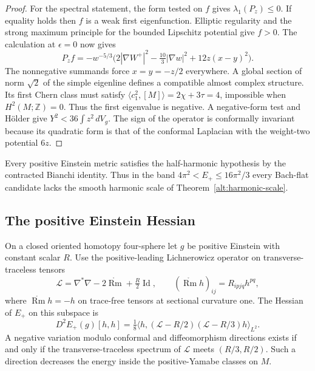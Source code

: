\begin{proof}
For the spectral statement, the form tested on \(f\) gives
\(\lambda_1(P_z)\le0\). If equality holds then \(f\) is a
weak first eigenfunction. Elliptic regularity and the strong
maximum principle for the bounded Lipschitz potential give
\(f>0\). The calculation at \(\epsilon=0\) now gives
\[
 P_z f=-w^{-5/3}
     \bigl(2|\nabla W^+|^2-\tfrac{10}{3}|\nabla w|^2
                    +12z(x-y)^2\bigr).
\]
The nonnegative summands force \(x=y=-z/2\) everywhere.
A global section of norm \(\sqrt2\) of the simple eigenline
defines a compatible almost complex structure. Its first
Chern class must satisfy
\(\langle c_1^2,[M]\rangle=2\chi+3\tau=4\), impossible
when \(H^2(M;\mathbb Z)=0\). Thus the first eigenvalue is
negative. A negative-form test and Hölder give
\(Y^2<36\int z^2\,dV_g\). The sign of the operator is conformally
invariant because its quadratic form is that of the conformal
Laplacian with the weight-two potential \(6z\).
\end{proof}

Every positive Einstein metric satisfies the half-harmonic
hypothesis by the contracted Bianchi identity. Thus in the band
\(4\pi^2<E_+\le16\pi^2/3\) every Bach-flat candidate lacks
the smooth harmonic scale of Theorem~\ref{alt:harmonic-scale}.

\subsection{The positive Einstein Hessian}

\begin{proposition}
\label{alt:einstein-hessian}
On a closed oriented homotopy four-sphere let \(g\) be positive
Einstein with constant scalar \(R\). Use the positive-leading
Lichnerowicz operator on transverse-traceless tensors
\[
 \mathcal L=\nabla^*\nabla-2\mathring{\operatorname{Rm}}
                       +\tfrac R2\operatorname{Id},
 \qquad (\mathring{\operatorname{Rm}}h)_{ij}=R_{ipjq}h^{pq},
\]
where \(\mathring{\operatorname{Rm}}h=-h\) on trace-free tensors
at sectional curvature one. The Hessian of \(E_+\) on this
subspace is
\begin{equation}\label{alt:hessian}
 D^2E_+(g)[h,h]=\tfrac18
         \langle h,(\mathcal L-R/2)(\mathcal L-R/3)h\rangle_{L^2}.
\end{equation}
A negative variation modulo conformal and diffeomorphism
directions exists if and only if the transverse-traceless spectrum
of \(\mathcal L\) meets \((R/3,R/2)\). Such a direction
decreases the energy inside the positive-Yamabe classes on \(M\).
\end{proposition}

